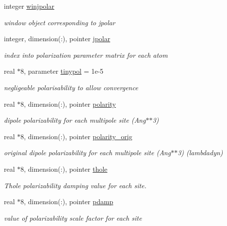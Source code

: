 \begin{DoxyCompactItemize}
integer \hyperlink{classpolar_aa5a482c70037e55aa86b48cfd025a2b4}{winjpolar}
\begin{DoxyCompactList}\small\item\em window object corresponding to jpolar \end{DoxyCompactList}\item 
integer, dimension(\-:), pointer \hyperlink{classpolar_acb04e27fba4c3f599042c07f6f5c280e}{jpolar}
\begin{DoxyCompactList}\small\item\em index into polarization parameter matrix for each atom \end{DoxyCompactList}\item 
real $\ast$8, parameter \hyperlink{classpolar_ac76c3b5b686c0cdb26312751ef275b31}{tinypol} = 1e-\/5
\begin{DoxyCompactList}\small\item\em negligeable polarisability to allow convergence \end{DoxyCompactList}\item 
real $\ast$8, dimension(\-:), pointer \hyperlink{classpolar_a81e82044b89e2acb286689700555d226}{polarity}
\begin{DoxyCompactList}\small\item\em dipole polarizability for each multipole site (Ang$\ast$$\ast$3) \end{DoxyCompactList}\item 
real $\ast$8, dimension(\-:), pointer \hyperlink{classpolar_a23a334fc3e13f4c7405f4542ce8926e0}{polarity\-\_\-orig}
\begin{DoxyCompactList}\small\item\em original dipole polarizability for each multipole site (Ang$\ast$$\ast$3) (lambdadyn) \end{DoxyCompactList}\item 
real $\ast$8, dimension(\-:), pointer \hyperlink{classpolar_af6a74c3444e3a1608e79dfc5dc17d15a}{thole}
\begin{DoxyCompactList}\small\item\em Thole polarizability damping value for each site. \end{DoxyCompactList}\item 
real $\ast$8, dimension(\-:), pointer \hyperlink{classpolar_a55d7218490afd5619f6ae489efa8d659}{pdamp}
\begin{DoxyCompactList}\small\item\em value of polarizability scale factor for each site \end{DoxyCompactList}\item 

\end{DoxyCompactItemize}
